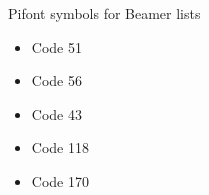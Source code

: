 \documentclass{beamer}
\begin{document}
\begin{frame}{Pifont symbols for Beamer lists}
\begin{itemize}
    \item[\ding{51}] Code 51
    \item[\ding{56}] Code 56
    \item[\ding{43}] Code 43
    \item[\ding{118}] Code 118
    \item[\ding{170}] Code 170
\end{itemize}
\end{frame}
\end{document}
